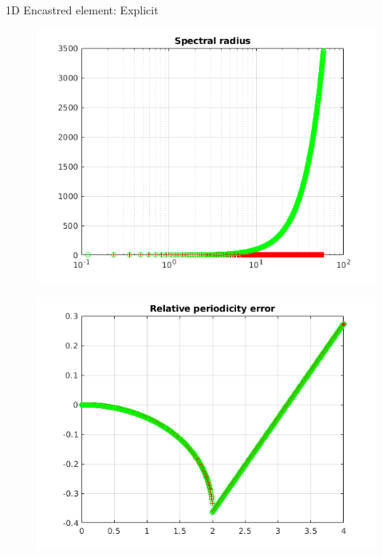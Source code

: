 \begin{frame}{1D Encastred element: Explicit}
\begin{figure}[ht]
\begin{minipage}[b]{0.5\linewidth}
  \end{minipage}%
  \begin{minipage}[b]{0.5\linewidth}
    \centering
    \includegraphics[scale=.35]{images/enc-exp-2.png} \\
  \end{minipage} 
  \begin{minipage}[b]{0.5\linewidth}
    \centering
    \includegraphics[scale=.35]{images/enc-exp-3.png} \\


\end{minipage}
\end{figure}
\end{frame}
